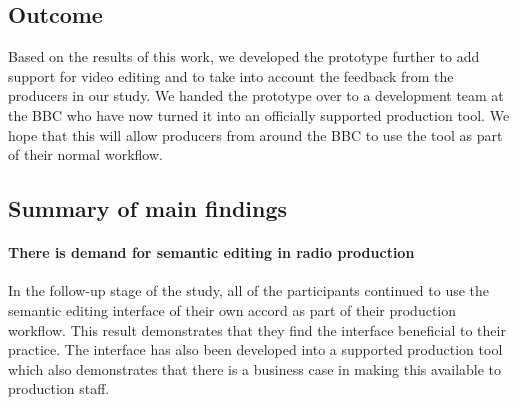 






\subsection{Outcome}
Based on the results of this work, we developed the prototype further to add support for video editing and to take into
account the feedback from the producers in our study.  We handed the prototype over to a development team at the BBC
who have now turned it into an officially supported production tool. We hope that this will allow producers from around
the BBC to use the tool as part of their normal workflow.

\subsection{Summary of main findings}\label{sec:findings}


\paragraph{There is demand for semantic editing in radio production}
In the follow-up stage of the study, all of the participants continued to use the semantic editing interface of their
own accord as part of their production workflow. This result demonstrates that they find the interface beneficial to
their practice. The interface has also been developed into a supported production tool which also demonstrates that
there is a business case in making this available to production staff.

